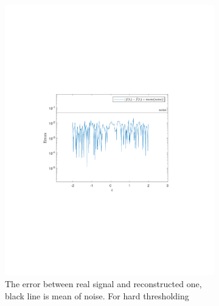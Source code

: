 \documentclass[a4paper]{article}
\begin{document}
    \begin{figure}[H]
	\begin{subfigure}{0.49\textwidth}
	\centering
	\centering
\includegraphics[trim={3.5cm 8cm 4cm 9cm},clip,width=1\textwidth]{Images/Delta=0.1Better.pdf}
\caption{The error between real signal and reconstructed one, black line is mean of noise. For hard thresholding}
\label{sub:Delta=0.1Better}
\end{subfigure}
\begin{subfigure}{0.49\textwidth}
	\centering

\end{subfigure}
\end{figure}
\end{document}
